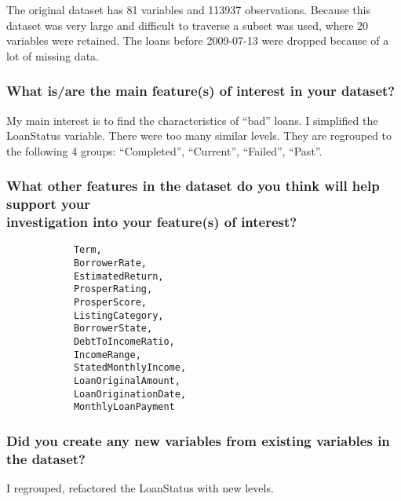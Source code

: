 \documentclass[]{article}
\begin{document}
The original dataset has 81 variables and 113937 observations. Because
this dataset was very large and difficult to traverse a subset was used,
where 20 variables were retained. The loans before 2009-07-13 were
dropped because of a lot of missing data.

\subsubsection{What is/are the main feature(s) of interest in your
dataset?}\label{what-isare-the-main-features-of-interest-in-your-dataset}

My main interest is to find the characteristics of ``bad'' loans. I
simplified the LoanStatus variable. There were too many similar levels.
They are regrouped to the following 4 groups: ``Completed'',
``Current'', ``Failed'', ``Past''.

\subsubsection{\texorpdfstring{What other features in the dataset do you
think will help support your\\
investigation into your feature(s) of
interest?}{What other features in the dataset do you think will help support your investigation into your feature(s) of interest?}}\label{what-other-features-in-the-dataset-do-you-think-will-help-support-your-investigation-into-your-features-of-interest}

\begin{verbatim}
            Term,
            BorrowerRate,
            EstimatedReturn,
            ProsperRating,
            ProsperScore,
            ListingCategory,
            BorrowerState,
            DebtToIncomeRatio,
            IncomeRange,
            StatedMonthlyIncome,
            LoanOriginalAmount,
            LoanOriginationDate,
            MonthlyLoanPayment
\end{verbatim}

\subsubsection{Did you create any new variables from existing variables
in the
dataset?}\label{did-you-create-any-new-variables-from-existing-variables-in-the-dataset}

I regrouped, refactored the LoanStatus with new levels.
\end{document}
